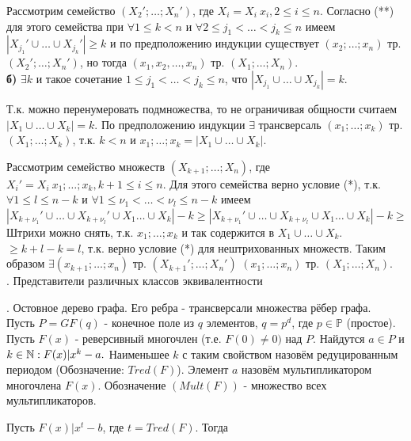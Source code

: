 Рассмотрим семейство $(X_2'; \dots; X_n')$, где $X_i=X_i \ {x_i}, 2 \leq i \leq n$.
Согласно (**) для этого семейства при $\forall 1 \leq k < n$ и $\forall 2 \leq j_1 < \dots < j_k \leq n$ имеем $|X_{j_1}' \cup \dots \cup X_{j_k}'| \geq k$ и по предположению индукции существует $(x_2; \dots; x_n)$ тр. $(X_2'; \dots; X_n')$, но тогда $(x_1, x_2, \dots, x_n)$ тр. $(X_1; \dots; X_n)$.\\

\textbf{б)} $\exists k$ и такое сочетание $1 \leq j_1 < \dots < j_k \leq n$, что $|X_{j_1} \cup \dots \cup X_{j_k}|=k$.

Т.к. можно перенумеровать подмножества, то не ограничивая общности считаем $|X_1 \cup \dots \cup X_k|=k$. По предположению индукции $\exists$ трансверсаль $(x_1; \dots; x_k)$ тр. $(X_1; \dots; X_k)$, т.к. $k<n$ и ${x_1;\dots;x_k}=|X_1 \cup \dots \cup X_k|$.

Рассмотрим семейство множеств $(X_{k+1}; \dots; X_n)$, где $X_i'=X_i \ {x_1;\dots;x_k}, k+1 \leq i \leq n$. Для этого семейства верно условие (*), т.к. $\forall 1 \leq l \leq n-k$ и $\forall 1 \leq \nu_1 < \dots < \nu_l \leq n-k$ имеем $|X_{k+{\nu_1}}' \cup \dots \cup X_{k+{\nu_l}}' \cup X_1 \dots \cup X_k|-k \geq |X_{k+{\nu_1}}' \cup \dots \cup X_{k+{\nu_l}} \cup X_1 \dots \cup X_k|-k \geq$
Штрихи можно снять, т.к. ${x_1;\dots;x_k}$ и так содержится в $X_1 \cup \dots \cup X_k$.
$\geq k+l-k=l$, т.к. верно условие (*) для нештрихованных множеств. Таким образом $\exists  (x_{k+1}; \dots; x_n)$ тр. $(X_{k+1}'; \dots; X_n')$ \Rightarrow \exists $(x_1; \dots; x_n)$ тр. $(X_1; \dots; X_n)$.\\

. Представители различных классов эквивалентности

. Остовное дерево графа. Его ребра - трансверсали множества рёбер графа.\\

\opr Пусть $P=GF(q)$ - конечное поле из $q$ элементов, $q=p^d$, где $p \in \mathds{P}$ (простое). Пусть $F(x)$ - реверсивный многочлен (т.е. $F(0) \neq 0 )$ над $P$. Найдутся $a \in P$ и $k \in \mathbb{N} : F(x)| x^k - a.$ Наименьшее $k$ с таким свойством назовём редуцированным периодом (Обозначение: $Tred(F)$). Элемент $a$ назовём мультипликатором многочлена $F(x)$. Обозначение $(Mult(F))$ - множество всех мультипликаторов.

Пусть $F(x)|x^t - b$, где $t = Tred(F)$. Тогда

\utv \\

